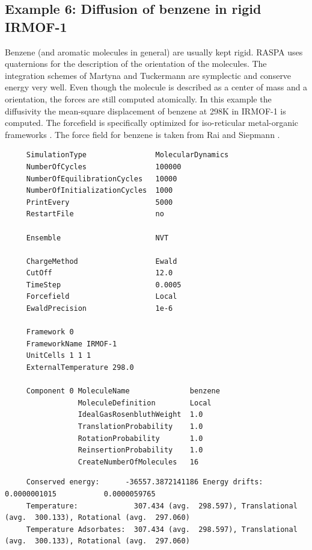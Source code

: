 \subsection*{Example 6: Diffusion of benzene in rigid IRMOF-1}

Benzene (and aromatic molecules in general) are usually kept rigid. RASPA uses quaternions for the description of the
orientation of the molecules. The integration schemes of Martyna and Tuckermann are symplectic and conserve energy
very well. Even though the molecule is described as a center of mass and a orientation, the forces are still computed
atomically. In this example the diffusivity the mean-square displacement of benzene at 298K in IRMOF-1 is computed.
The forcefield is specifically
optimized for iso-reticular metal-organic frameworks \cite{Dubbeldam2007}.
The force field for benzene is taken from Rai and Siepmann \cite{Rai2007}.

\begin{tiny}
\begin{verbatim}
     SimulationType                MolecularDynamics
     NumberOfCycles                100000
     NumberOfEquilibrationCycles   10000
     NumberOfInitializationCycles  1000
     PrintEvery                    5000
     RestartFile                   no
     
     Ensemble                      NVT
     
     ChargeMethod                  Ewald
     CutOff                        12.0
     TimeStep                      0.0005
     Forcefield                    Local
     EwaldPrecision                1e-6
     
     Framework 0
     FrameworkName IRMOF-1
     UnitCells 1 1 1
     ExternalTemperature 298.0
     
     Component 0 MoleculeName              benzene
                 MoleculeDefinition        Local
                 IdealGasRosenbluthWeight  1.0
                 TranslationProbability    1.0
                 RotationProbability       1.0
                 ReinsertionProbability    1.0
                 CreateNumberOfMolecules   16
\end{verbatim}
\end{tiny}

\begin{tiny}
\begin{verbatim}
     Conserved energy:      -36557.3872141186 Energy drifts:  0.0000001015           0.0000059765
     Temperature:             307.434 (avg.  298.597), Translational (avg.  300.133), Rotational (avg.  297.060)
     Temperature Adsorbates:  307.434 (avg.  298.597), Translational (avg.  300.133), Rotational (avg.  297.060)
\end{verbatim}
\end{tiny}

